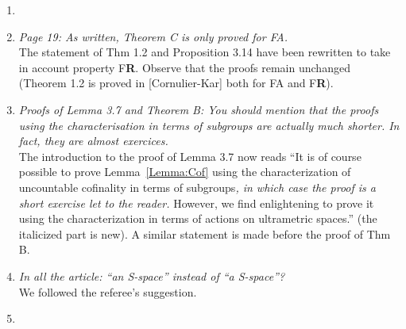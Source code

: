 \documentclass[english,a4paper]{article}
\DeclareMathOperator\ab{ab}
\newcommand*{\FA}{FA}
\newcommand*{\FR}{F\textbf{R}}
\newcommand*\Z{\mathbf{Z}}
\begin{document}
\begin{enumerate}
%
\item\textit{}\\%






\item\textit{Page 19: As written, Theorem C is only proved for \FA.}\\
The statement of Thm 1.2 and Proposition 3.14 have been rewritten to take in account property \FR. Observe that the proofs remain unchanged (Theorem 1.2 is proved in [Cornulier-Kar] both for \FA{} and \FR).
%
\item\textit{Proofs of Lemma 3.7 and Theorem B: You should mention that the proofs using the characterisation in terms of subgroups are actually much shorter. In fact, they are almost exercices.}\\
The introduction to the proof of Lemma 3.7 now reads ``It is of course possible to prove Lemma~\ref{Lemma:Cof} using the characterization of uncountable cofinality in terms of subgroups\emph{, in which case the proof is a short exercise let to the reader.} However, we find enlightening to prove it using the characterization in terms of actions on ultrametric spaces.'' (the italicized part is new).
A similar statement is made before the proof of Thm B.
%
\item\textit{In all the article: “an S-space” instead of “a S-space”?}\\
We followed the referee's suggestion.
%
\item\textit{}\\









\end{enumerate}
\end{document}
